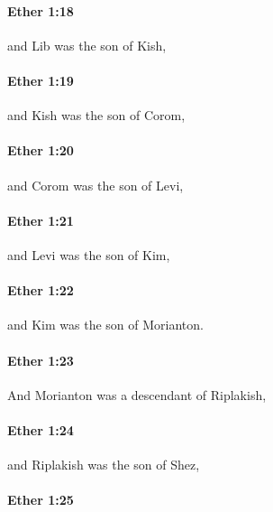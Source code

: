 		\paragraph{Ether 1:18} %
			\label{ETHER-1-18}

			and Lib was the son of Kish,

		\paragraph{Ether 1:19} %
			\label{ETHER-1-19}

			and Kish was the son of Corom,

		\paragraph{Ether 1:20} %
			\label{ETHER-1-20}

			and Corom was the son of Levi,

		\paragraph{Ether 1:21} %
			\label{ETHER-1-21}

			and Levi was the son of Kim,

		\paragraph{Ether 1:22} %
			\label{ETHER-1-22}

			and Kim was the son of Morianton.

		\paragraph{Ether 1:23} %
			\label{ETHER-1-23}

			And Morianton was a descendant of Riplakish,

		\paragraph{Ether 1:24} %
			\label{ETHER-1-24}

			and Riplakish was the son of Shez,

		\paragraph{Ether 1:25} %
			\label{ETHER-1-25}

